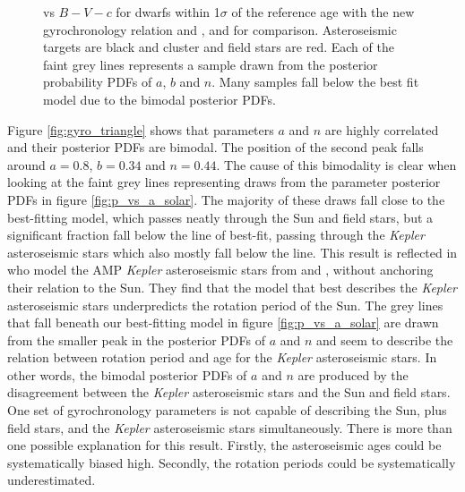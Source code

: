 \begin{figure}
\begin{center}
{        }
    \end{center}
    \caption[Period vs colour over a range of ages]
{ \prot vs $B-V-c$ for dwarfs within 1$\sigma$ of the
reference age with the new gyrochronology relation and \citet{Barnes2007}, and
\citet{Mamajek2008} for comparison.
Asteroseismic targets are black and
cluster and field stars are red.
Each of the faint grey lines represents a
sample drawn from the posterior probability PDFs of $a$, $b$ and $n$.
Many samples fall below the best fit model due to the bimodal posterior PDFs.
\label{fig:subfigures2}}
\end{figure}

Figure \ref{fig:gyro_triangle} shows that parameters $a$ and $n$ are
highly correlated and their posterior PDFs are bimodal.
The position of the second peak falls around $a = 0.8$, $b = 0.34$ and
$n = 0.44$.
The cause of this bimodality is clear when looking at the faint grey lines
representing draws from the parameter posterior PDFs in
figure \ref{fig:p_vs_a_solar}.
The majority of these draws fall close to the best-fitting model, which passes
neatly through the Sun and field stars, but a significant fraction fall
below the line of best-fit, passing through the {\it Kepler} asteroseismic
stars which also mostly fall below the line.
This result is reflected in \citet{Garcia2014} who model the AMP {\it Kepler}
asteroseismic stars from \citet{Mathur2012} and \citet{Metcalfe2014}, without
anchoring their relation to the Sun.
They find that the model that best describes the {\it Kepler} asteroseismic
stars underpredicts the rotation period of the Sun.
The grey lines that fall beneath our best-fitting model in figure
\ref{fig:p_vs_a_solar} are drawn from the smaller peak in the posterior PDFs
of $a$ and $n$ and seem to describe the relation between rotation period and
age for the {\it Kepler} asteroseismic stars.
In other words, the bimodal posterior PDFs of $a$ and $n$ are produced by the
disagreement between the {\it Kepler} asteroseismic stars and the Sun and field
stars.
One set of gyrochronology parameters is not
capable of describing the Sun, plus field stars, and the {\it Kepler}
asteroseismic stars simultaneously.
There is more than one possible explanation for this result.
Firstly, the asteroseismic ages could be systematically biased high.
Secondly, the rotation periods could be systematically underestimated.

